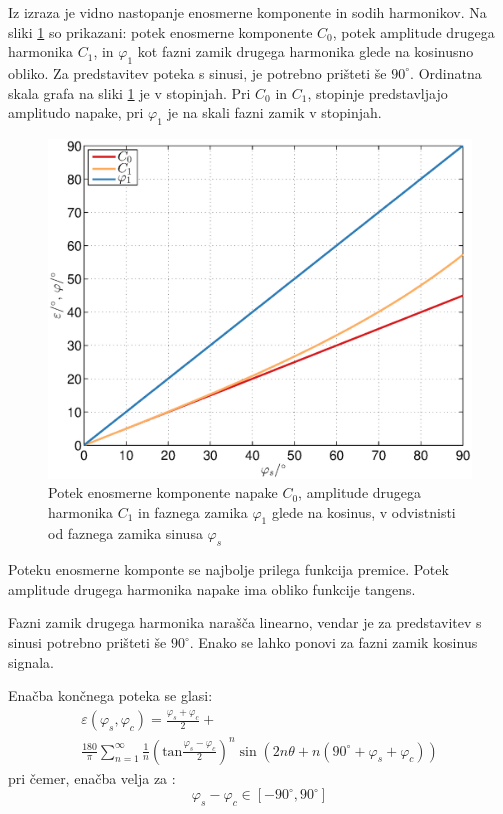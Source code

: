 \documentclass[a4paper]{article}
\begin{document}
Iz  izraza je vidno nastopanje enosmerne komponente in sodih harmonikov. Na sliki \ref{fig:fis} so prikazani: potek enosmerne komponente $C_0$, potek amplitude drugega harmonika $C_1$, in $\varphi_1$ kot fazni zamik drugega harmonika glede na kosinusno obliko. Za predstavitev poteka s sinusi, je potrebno prišteti še $90^\circ$. Ordinatna skala grafa na sliki \ref{fig:fis} je v stopinjah. Pri $C_0$ in $C_1$, stopinje predstavljajo amplitudo napake, pri $\varphi_{1}$ je na skali fazni zamik v stopinjah.
\begin{figure}[!htb]
	\begin{center}
		\includegraphics[width=\linewidth]{./Slike/fis.eps}
		\caption{Potek enosmerne komponente napake $C_0$, amplitude drugega harmonika $C_1$ in faznega zamika $\varphi_1$ glede na kosinus, v odvistnisti od faznega zamika sinusa $\varphi_{s}$} \label{fig:fis}
	\end{center}
\end{figure}

Poteku enosmerne komponte se najbolje prilega funkcija premice.
Potek amplitude drugega harmonika napake ima obliko funkcije tangens.

Fazni zamik drugega harmonika narašča linearno, vendar je za predstavitev s sinusi potrebno prišteti še $90^\circ$. Enako se lahko ponovi za fazni zamik kosinus signala.

Enačba končnega poteka se glasi:
\begin{multline}
\label{equ:fis_err}
\varepsilon(\varphi_{s},\varphi_{c}) = \frac{\varphi_{s}+\varphi_{c}}{2}+\\ \frac{180}{\pi}\sum_{n=1}^{\infty}\frac{1}{n} (\mathrm{tan}\frac{\varphi_{s}-\varphi_{c}}{2})^n \sin (2n \theta+n(90^\circ +\varphi_{s}+\varphi_{c}))
\end{multline}
pri čemer, enačba velja za :
$$ \varphi_{s}-\varphi_{c} \in [ -90^\circ , 90^\circ ] $$
\end{document}
